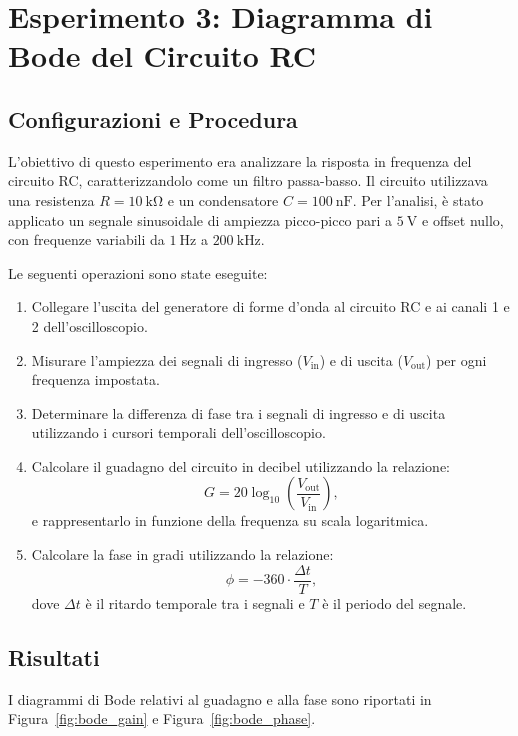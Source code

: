 \documentclass[a4paper,12pt]{article}
\begin{document}


\section{Esperimento 3: Diagramma di Bode del Circuito RC}

\subsection{Configurazioni e Procedura}

\begin{multicols}{2}
L'obiettivo di questo esperimento era analizzare la risposta in frequenza del circuito RC, caratterizzandolo come un filtro passa-basso. Il circuito utilizzava una resistenza \( R = \SI{10}{\kilo\ohm} \) e un condensatore \( C = \SI{100}{\nano\farad} \). Per l'analisi, è stato applicato un segnale sinusoidale di ampiezza picco-picco pari a \(\SI{5}{\volt}\) e offset nullo, con frequenze variabili da \(\SI{1}{\hertz}\) a \(\SI{200}{\kilo\hertz}\). 

Le seguenti operazioni sono state eseguite:
\begin{enumerate}
    \item Collegare l'uscita del generatore di forme d’onda al circuito RC e ai canali 1 e 2 dell'oscilloscopio.
    \item Misurare l'ampiezza dei segnali di ingresso (\(V_{\text{in}}\)) e di uscita (\(V_{\text{out}}\)) per ogni frequenza impostata.
    \item Determinare la differenza di fase tra i segnali di ingresso e di uscita utilizzando i cursori temporali dell’oscilloscopio.
    \item Calcolare il guadagno del circuito in decibel utilizzando la relazione:
    \[
    G = 20 \log_{10} \left( \frac{V_{\text{out}}}{V_{\text{in}}} \right),
    \]
    e rappresentarlo in funzione della frequenza su scala logaritmica.
    \item Calcolare la fase in gradi utilizzando la relazione:
    \[
    \phi = -360 \cdot \frac{\Delta t}{T},
    \]
    dove \(\Delta t\) è il ritardo temporale tra i segnali e \(T\) è il periodo del segnale.
\end{enumerate}
\end{multicols}

\subsection{Risultati}
I diagrammi di Bode relativi al guadagno e alla fase sono riportati in Figura~\ref{fig:bode_gain} e Figura~\ref{fig:bode_phase}. 
\end{document}
